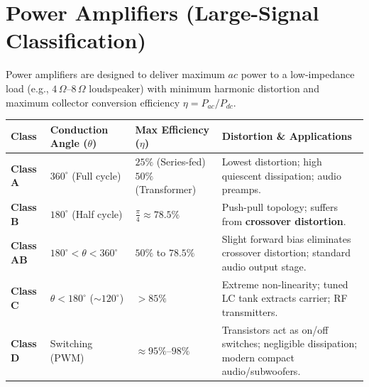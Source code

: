 \documentclass[12pt,a4paper]{article}
\begin{document}
\section{Power Amplifiers (Large-Signal Classification)}

\begin{tcolorbox}[defbox, title={Classification of Power Amplifiers by Conduction Angle}]
Power amplifiers are designed to deliver maximum $ac$ power to a low-impedance load (e.g., $4\,\Omega$--$8\,\Omega$ loudspeaker) with minimum harmonic distortion and maximum collector conversion efficiency $\eta = P_{ac} / P_{dc}$.
\end{tcolorbox}

\par\vspace{6pt}\noindent
\begin{tabularx}{\linewidth}{|B{2.2cm}|B{2.6cm}|B{2.7cm}|Y|}
\hline
\textbf{Class} & \textbf{Conduction Angle ($\theta$)} & \textbf{Max Efficiency ($\eta$)} & \textbf{Distortion \& Applications} \\
\hline
\textbf{Class A} & $360^\circ$ (Full cycle) & $25\%$ (Series-fed)\newline $50\%$\newline (Transformer) & Lowest distortion; high quiescent dissipation; audio preamps. \\
\hline
\textbf{Class B} & $180^\circ$ (Half cycle) & $\frac{\pi}{4} \approx 78.5\%$ & Push-pull topology; suffers from \textbf{crossover distortion}. \\
\hline
\textbf{Class AB}& $180^\circ < \theta < 360^\circ$ & $50\%$ to $78.5\%$ & Slight forward bias eliminates crossover distortion; standard audio output stage. \\
\hline
\textbf{Class C} & $\theta < 180^\circ$ ($\sim 120^\circ$) & $> 85\%$ & Extreme non-linearity; tuned LC tank extracts carrier; RF transmitters. \\
\hline
\textbf{Class D} & Switching (PWM) & $\approx 95\%$--$98\%$ & Transistors act as on/off switches; negligible dissipation; modern compact audio/subwoofers. \\
\hline
\end{tabularx}
\par\vspace{12pt}
\end{document}

